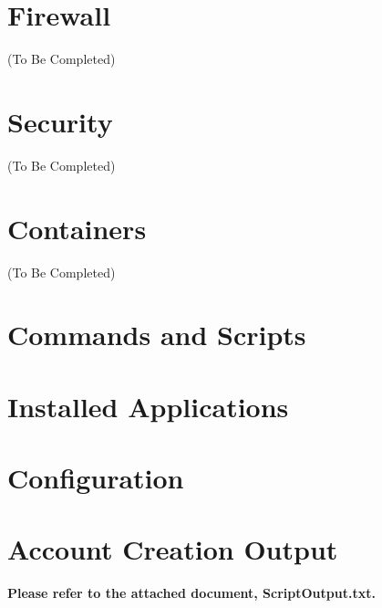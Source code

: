 \documentclass[
10pt, %
letterpaper, %
oneside, %
headinclude,footinclude, %
BCOR5mm, %
]{scrartcl}
\begin{document}
\section{Firewall}
(To Be Completed)

\section{Security}
(To Be Completed)


\section{Containers}
(To Be Completed)

\appendix
\section{Commands and Scripts}

\section{Installed Applications}

\section{Configuration}

\section{Account Creation Output}
\textbf{Please refer to the attached document, ScriptOutput.txt.}
\end{document}
